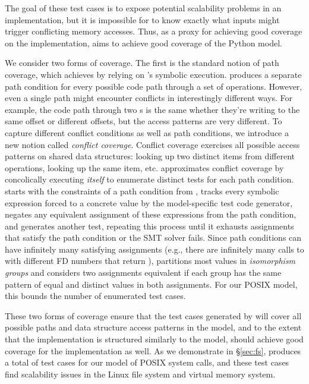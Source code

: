 The goal of these test cases is to expose potential scalability problems
in an implementation, but it is impossible for \generator{} to know
exactly what inputs might trigger conflicting memory accesses.  Thus, as a
proxy for achieving good coverage on the implementation, \generator{}
aims to achieve good coverage of the Python model.

We consider two forms of coverage.
The first is the standard notion of path coverage, which \generator{}
achieves by relying on \analyzer{}'s symbolic execution.
%
\analyzer{} produces a separate path condition for every possible code
path through a set of operations.
%
However, even a single path might encounter conflicts in interestingly
different ways.
%
For example, the code path through two s is the
same whether they're writing to the same offset or different offsets,
but the access patterns are very different.
%
To capture different conflict conditions as well as path conditions, we
introduce a new notion called \emph{conflict coverage}.  Conflict coverage
exercises all possible access patterns on shared data structures:
looking up two distinct items from different operations, looking up
the same item, etc.
%
\generator approximates
conflict coverage by concolically executing \emph{itself}
to enumerate distinct tests for each path condition.  \generator
starts with the constraints of a path condition from \analyzer, tracks
every symbolic expression forced to a concrete value by the
model-specific test code
generator, negates any equivalent assignment of these expressions from
the path condition, and generates another test, repeating this process
until it exhausts assignments that satisfy the path condition or the SMT
solver fails.  Since
path conditions can have infinitely many satisfying assignments (e.g.,
there are infinitely many calls to  with different FD numbers
that return ), \generator partitions most values in
\emph{isomorphism groups} and considers two assignments equivalent if
each group has the same
pattern of equal and distinct values in both assignments.  For our POSIX
model, this
bounds the number of enumerated test cases. \cbend

These two forms of coverage ensure that the test cases
generated by \generator{} will cover all possible paths and data structure
access patterns in the model, and to the extent that the implementation
is structured similarly to the model, should achieve good coverage
for the implementation as well.  As we demonstrate in \S\ref{sec:fs},
\generator{} produces a total of  test cases
for our model of  POSIX
system calls, and these
test cases find scalability issues in the Linux  file system
and virtual memory system.


